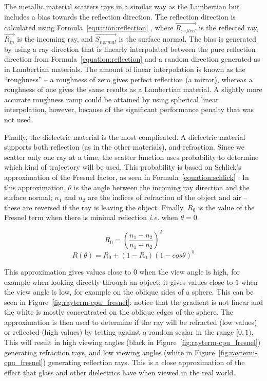 The metallic material scatters rays in a similar way as the Lambertian but includes a bias towards the reflection direction.
The reflection direction is calculated using Formula~\ref{equation:reflection} \cite{prunier2017shading}, where $\vec{R_{reflect}}$ is the reflected ray, $\vec{R_{in}}$ is the incoming ray, and $\vec{S_{normal}}$ is the surface normal.
The bias is generated by using a ray direction that is linearly interpolated between the pure reflection direction from Formula~\ref{equation:reflection} and a random direction generated as in Lambertian materials.
The amount of linear interpolation is known as the ``roughness'' -- a roughness of zero gives perfect reflection (a mirror), whereas a roughness of one gives the same results as a Lambertian material.
A slightly more accurate roughness ramp could be attained by using spherical linear interpolation, however, because of the significant performance penalty that was not used.

Finally, the dielectric material is the most complicated.
A dielectric material supports both reflection (as in the other materials), and refraction.
Since we scatter only one ray at a time, the scatter function uses probability to determine which kind of trajectory will be used.
This probability is based on Schlick's approximation of the Fresnel factor, as seen in Formula~\ref{equation:schlick} \cite{schlick1994inexpensive, learnopengltheory, prunier2017shading}.
In this approximation, $\theta$ is the angle between the incoming ray direction and the surface normal; $n_1$ and $n_2$ are the indices of refraction of the object and air -- these are reversed if the ray is leaving the object.
Finally, $R_0$ is the value of the Fresnel term when there is minimal reflection \textit{i.e.} when $\theta = 0$.

\begin{equation}
\label{equation:schlick_base}
  R_0 = (\frac{n_1 - n_2}{n_1 + n_2})^2
\end{equation}
\begin{equation}
\label{equation:schlick}
  R(\theta) = R_0 + (1 - R_0)(1 - cos \theta)^5
\end{equation}

This approximation gives values close to $0$ when the view angle is high, for example when looking directly through an object; it gives values close to $1$ when the view angle is low, for example on the oblique sides of a sphere.
This can be seen in Figure~\ref{fig:rayterm-cpu_fresnel}: notice that the gradient is not linear and the white is mostly concentrated on the oblique edges of the sphere.
The approximation is then used to determine if the ray will be refracted (low values) or reflected (high values) by testing against a random scalar in the range $[0, 1)$.
This will result in high viewing angles (black in Figure~\ref{fig:rayterm-cpu_fresnel}) generating refraction rays, and low viewing angles (white in Figure~\ref{fig:rayterm-cpu_fresnel}) generating reflection rays.
This is a close approximation of the effect that glass and other dielectrics have when viewed in the real world.

